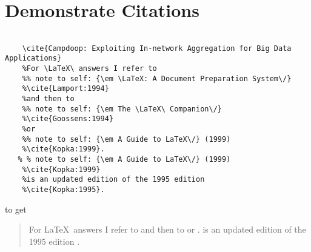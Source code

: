 %
%


\chapter{Demonstrate Citations}


\begin{verbatim}
    
	\cite{Campdoop: Exploiting In-network Aggregation for Big Data Applications}
    %For \LaTeX\ answers I refer to
    %% note to self: {\em \LaTeX: A Document Preparation System\/}
    %\cite{Lamport:1994}
    %and then to
    %% note to self: {\em The \LaTeX\ Companion\/}
    %\cite{Goossens:1994}
    %or
    %% note to self: {\em A Guide to LaTeX\/} (1999)
    %\cite{Kopka:1999}.
   % % note to self: {\em A Guide to LaTeX\/} (1999)
    %\cite{Kopka:1999}
    %is an updated edition of the 1995 edition
    %\cite{Kopka:1995}.
\end{verbatim}

to get

\begin{quotation}
    For \LaTeX\ answers I refer to
    \cite{Lamport:1994}
    and then to
    \cite{Goossens:1994}
    or
    \cite{Kopka:1999}.
    \cite{Kopka:1999}
    is an updated edition of the 1995 edition
    \cite{Kopka:1995}.
\end{quotation}
